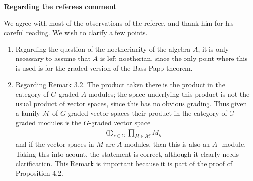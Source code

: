 \documentclass{article}
\begin{document}
\textbf{Regarding the referees comment}
\bigskip

We agree with most of the observations of the referee, and thank him for his 
careful reading. We wish to clarify a few points.

\begin{enumerate}
\item Regarding the question of the noetherianity of the algebra $A$, it is 
only necessary to assume that $A$ is left noetherian, since the only point 
where this is used is for the graded version of the Bass-Papp theorem.

\item Regarding Remark 3.2. The product taken there is the product in the 
category of $G$-graded $A$-modules; the space underlying this product is not 
the usual product of vector spaces, since this has no obvious grading. Thus 
given a family $\mathcal M$ of $G$-graded vector spaces their product in the 
category of $G$-graded modules is the $G$-graded vector space 
\begin{align*}
\bigoplus_{g \in G} \prod_{M \in \mathcal M} M_g
\end{align*}
and if the vector spaces in $M$ are $A$-modules, then this is also an $A$-
module. Taking this into acount, the statement is correct, although it clearly 
needs clarification. This Remark is important because it is part of the proof 
of Proposition 4.2.
\end{enumerate}
\end{document}
